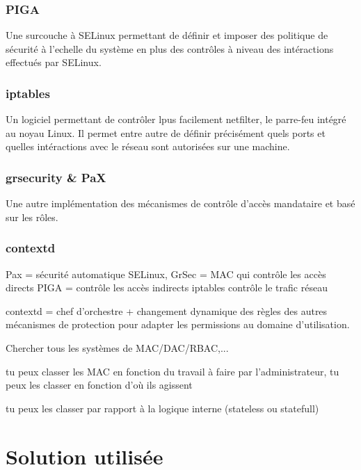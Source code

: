 \subsubsection{PIGA}

Une surcouche à SELinux permettant de définir et imposer des politique de sécurité à l'echelle du système en plus des contrôles à niveau des intéractions effectués par SELinux.

\subsubsection{iptables}

Un logiciel permettant de contrôler lpus facilement netfilter, le parre-feu intégré au noyau Linux. Il permet entre autre de définir précisément quels ports et quelles intéractions avec le réseau sont autorisées sur une machine.

\subsubsection{grsecurity \& PaX}

Une autre implémentation des mécanismes de contrôle d'accès mandataire et basé sur les rôles.

\subsubsection{contextd}

Pax = sécurité automatique
SELinux, GrSec = MAC qui contrôle les accès directs
PIGA = contrôle les accès indirects
iptables contrôle le trafic réseau

contextd = chef d'orchestre + changement dynamique des règles des autres  mécanismes de protection pour adapter les permissions au domaine d'utilisation.

Chercher tous les systèmes de MAC/DAC/RBAC,...

tu peux classer les MAC en fonction du travail à faire par l'administrateur, tu peux les classer en fonction d'où ils agissent

tu peux les classer par rapport à la logique interne (stateless ou statefull)

\newpage

\section{Solution utilisée}


